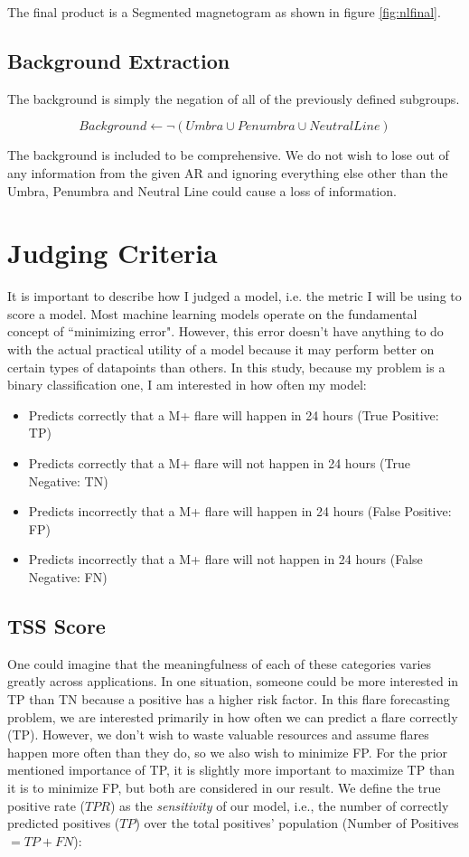 \documentclass[defaultstyle,11pt]{thesis}
\begin{document}
The final product is a Segmented magnetogram as shown in figure \ref{fig:nlfinal}. 

\section{Background Extraction}

The background is simply the negation of all of the previously defined subgroups.

$$Background \gets \neg(Umbra \cup Penumbra \cup Neutral Line)$$

The background is included to be comprehensive. We do not wish to lose out of any information from the given AR and ignoring everything else other than the Umbra, Penumbra and Neutral Line could cause a loss of information.


\chapter{Judging Criteria}
\label{appendix:judjingcriteria}

It is important to describe how I judged a model, i.e. the metric I will be using to score a model. Most machine learning models operate on the fundamental concept of ``minimizing error". However, this error doesn't have anything to do with the actual practical utility of a model because it may perform better on certain types of datapoints than others. In this study, because my problem is a binary classification one, I am interested in how often my model:

\begin{itemize}
    \item Predicts correctly that a M+ flare will happen in 24 hours (True Positive: TP)
    \item Predicts correctly that a M+ flare will not happen in 24 hours (True Negative: TN)
    \item Predicts incorrectly that a M+ flare will happen in 24 hours (False Positive: FP)
    \item Predicts incorrectly that a M+ flare will not happen in 24 hours (False Negative: FN)
\end{itemize}

\section{TSS Score}
One could imagine that the meaningfulness of each of these categories varies greatly across applications. In one situation, someone could be more interested in TP than TN because a positive has a higher risk factor. In this flare forecasting problem, we are interested primarily in how often we can predict a flare correctly (TP). However, we don't wish to waste valuable resources and assume flares happen more often than they do, so we also wish to minimize FP. For the prior mentioned importance of TP, it is slightly more important to maximize TP than it is to minimize FP, but both are considered in our result. We define the true positive rate ($TPR$) as the \textit{sensitivity} of our model, i.e., the number of correctly predicted positives ($TP$) over the total positives' population (Number of Positives $= TP + FN$):
\end{document}
